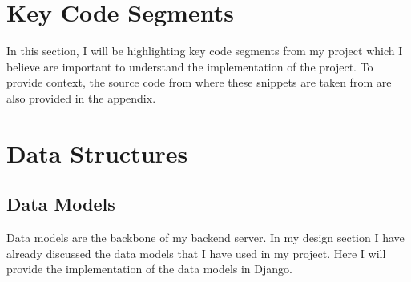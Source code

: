 \section{Key Code Segments}
In this section, I will be highlighting key code segments from my project which I believe are important to understand the implementation of the project. To provide context, the source code from where these snippets are taken from are also provided in the appendix.


\section{Data Structures}

\subsection{Data Models}
Data models are the backbone of my backend server. In my design section I have already discussed the data models that I have used in my project. Here I will provide the implementation of the data models in Django.

